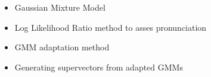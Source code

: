 \begin{itemize}
	\item Gaussian Mixture Model
	\item Log Likelihood Ratio method to asses pronunciation
	\item GMM adaptation method
	\item Generating supervectors from adapted GMMs
\end{itemize}